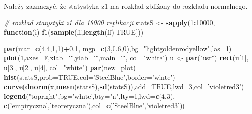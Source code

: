 \documentclass[polish,]{book}
\newenvironment{Shaded}{\begin{snugshade}}{\end{snugshade}}
\newcommand{\CommentTok}[1]{\textcolor[rgb]{0.56,0.35,0.01}{\textit{#1}}}
\newcommand{\ControlFlowTok}[1]{\textcolor[rgb]{0.13,0.29,0.53}{\textbf{#1}}}
\newcommand{\DataTypeTok}[1]{\textcolor[rgb]{0.13,0.29,0.53}{#1}}
\newcommand{\DecValTok}[1]{\textcolor[rgb]{0.00,0.00,0.81}{#1}}
\newcommand{\FloatTok}[1]{\textcolor[rgb]{0.00,0.00,0.81}{#1}}
\newcommand{\KeywordTok}[1]{\textcolor[rgb]{0.13,0.29,0.53}{\textbf{#1}}}
\newcommand{\NormalTok}[1]{#1}
\newcommand{\OperatorTok}[1]{\textcolor[rgb]{0.81,0.36,0.00}{\textbf{#1}}}
\newcommand{\OtherTok}[1]{\textcolor[rgb]{0.56,0.35,0.01}{#1}}
\newcommand{\StringTok}[1]{\textcolor[rgb]{0.31,0.60,0.02}{#1}}
\begin{document}
Należy zaznaczyć, że statystyka z1 ma rozkład zbliżony do rozkładu normalnego.

\begin{Shaded}
\begin{Highlighting}[]
\CommentTok{# rozkład statystyki z1 dla 10000 replikacji}
\NormalTok{statsS <-}\StringTok{ }\KeywordTok{sapply}\NormalTok{(}\DecValTok{1}\OperatorTok{:}\DecValTok{10000}\NormalTok{, }\ControlFlowTok{function}\NormalTok{(i) }\KeywordTok{f1}\NormalTok{(}\KeywordTok{sample}\NormalTok{(ff,}\KeywordTok{length}\NormalTok{(ff),}\OtherTok{TRUE}\NormalTok{)))}
\end{Highlighting}
\end{Shaded}

\begin{Shaded}
\begin{Highlighting}[]
\KeywordTok{par}\NormalTok{(}\DataTypeTok{mar=}\KeywordTok{c}\NormalTok{(}\DecValTok{4}\NormalTok{,}\DecValTok{4}\NormalTok{,}\DecValTok{1}\NormalTok{,}\DecValTok{1}\NormalTok{)}\OperatorTok{+}\FloatTok{0.1}\NormalTok{, }\DataTypeTok{mgp=}\KeywordTok{c}\NormalTok{(}\DecValTok{3}\NormalTok{,}\FloatTok{0.6}\NormalTok{,}\DecValTok{0}\NormalTok{),}\DataTypeTok{bg=}\StringTok{"lightgoldenrodyellow"}\NormalTok{,}\DataTypeTok{las=}\DecValTok{1}\NormalTok{)}
\KeywordTok{plot}\NormalTok{(}\DecValTok{1}\NormalTok{,}\DataTypeTok{axes=}\NormalTok{F,}\DataTypeTok{xlab=}\StringTok{""}\NormalTok{,}\DataTypeTok{ylab=}\StringTok{""}\NormalTok{,}\DataTypeTok{main=}\StringTok{""}\NormalTok{, }\DataTypeTok{col=}\StringTok{"white"}\NormalTok{)}
\NormalTok{u <-}\StringTok{ }\KeywordTok{par}\NormalTok{(}\StringTok{"usr"}\NormalTok{)}
\KeywordTok{rect}\NormalTok{(u[}\DecValTok{1}\NormalTok{], u[}\DecValTok{3}\NormalTok{], u[}\DecValTok{2}\NormalTok{], u[}\DecValTok{4}\NormalTok{], }\DataTypeTok{col=}\StringTok{"white"}\NormalTok{)}
\KeywordTok{par}\NormalTok{(}\DataTypeTok{new=}\NormalTok{plot)}
\KeywordTok{hist}\NormalTok{(statsS,}\DataTypeTok{prob=}\OtherTok{TRUE}\NormalTok{,}\DataTypeTok{col=}\StringTok{'SteelBlue'}\NormalTok{,}\DataTypeTok{border=}\StringTok{'white'}\NormalTok{)}
\KeywordTok{curve}\NormalTok{(}\KeywordTok{dnorm}\NormalTok{(x,}\KeywordTok{mean}\NormalTok{(statsS),}\KeywordTok{sd}\NormalTok{(statsS)),}\DataTypeTok{add=}\OtherTok{TRUE}\NormalTok{,}\DataTypeTok{lwd=}\DecValTok{3}\NormalTok{,}\DataTypeTok{col=}\StringTok{'violetred3'}\NormalTok{)}
\KeywordTok{legend}\NormalTok{(}\StringTok{"topright"}\NormalTok{,}\DataTypeTok{bg=}\StringTok{'white'}\NormalTok{,}\DataTypeTok{bty=}\StringTok{"n"}\NormalTok{,}\DataTypeTok{lty=}\DecValTok{1}\NormalTok{,}\DataTypeTok{lwd=}\KeywordTok{c}\NormalTok{(}\DecValTok{4}\NormalTok{,}\DecValTok{3}\NormalTok{),}
       \KeywordTok{c}\NormalTok{(}\StringTok{'empiryczna'}\NormalTok{,}\StringTok{'teoretyczna'}\NormalTok{),}\DataTypeTok{col=}\KeywordTok{c}\NormalTok{(}\StringTok{'SteelBlue'}\NormalTok{,}\StringTok{'violetred3'}\NormalTok{))}
\end{Highlighting}
\end{Shaded}
\end{document}
